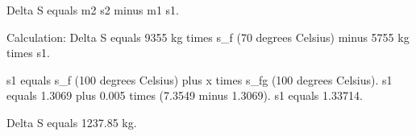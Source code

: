 Delta S equals m2 s2 minus m1 s1.  

Calculation:  
Delta S equals 9355 kg times s_f (70 degrees Celsius) minus 5755 kg times s1.  

s1 equals s_f (100 degrees Celsius) plus x times s_fg (100 degrees Celsius).  
s1 equals 1.3069 plus 0.005 times (7.3549 minus 1.3069).  
s1 equals 1.33714.  

Delta S equals 1237.85 kg.
